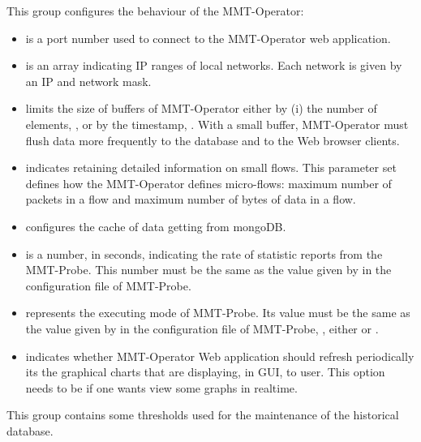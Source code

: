 This group configures the behaviour of the MMT-Operator:

\begin{itemize}
    \item {} is a port number used to connect to the MMT-Operator web application.

    \item {} is an array indicating IP ranges of local networks. Each network is given by an IP and network mask.
    
    \item {} limits the size of buffers of MMT-Operator either by (i) the number of elements, , or by the timestamp, . With a small buffer, MMT-Operator must flush data more frequently to the database and to the Web browser clients.
    
    \item {} indicates retaining detailed information on small flows. This parameter set defines how the MMT-Operator defines micro-flows: maximum number of packets in a flow and maximum number of bytes of data in a flow.
    
    \item {} configures the cache of data getting from mongoDB.  
    \item {} is a number, in seconds, indicating the rate of statistic reports from the MMT-Probe. This number must be the same as the value given by  in the configuration file of MMT-Probe.
    
    \item {} represents the executing mode of MMT-Probe. Its value must be the same as the value given by  in the configuration file of MMT-Probe, \eg, either  or .
    
    \item {} indicates whether MMT-Operator Web application should refresh periodically its the graphical charts that are displaying, in GUI, to user. This option needs to be \true if one wants view some graphs in realtime.
\end{itemize}

 This group contains some thresholds used for the maintenance of the historical database.

